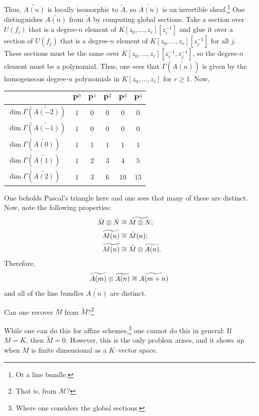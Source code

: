 \documentclass [11 pt, oneside] {article}
\begin{document}
Thus, $\widetilde{A(n)}$ is locally isomorphic to $\tilde A$, so $\widetilde{A(n)}$ is an invertible sheaf.\footnote{Or a line bundle.} One distinguishes $\widetilde{A(n)}$ from $\tilde A$ by computing global sections. Take a section over $U(f_i)$ that is a degree-$n$ element of $K[z_0,\hdots,z_r][z_i^{-1}]$ and glue it over a section of $U(f_j)$ that is a degree-$n$ element of $K[z_0,\hdots,z_r][z_j^{-1}]$ for all $j$. These sections must be the same over $K[z_0,\hdots,z_r][z_i^{-1},z_j^{-1}]$, so the degree-$n$ element must be a polynomial. Thus, one sees that $\Gamma(\widetilde{A(n)})$ is given by the homogeneous degree-$n$ polynomials in $K[z_0,\hdots,z_r]$ for $r\ge 1$. Now,
\begin{center}
\begin{tabular}{lccccc}
     & $\mathbf{P}^0$&$\mathbf{P}^1$&$\mathbf{P}^2$& $\mathbf{P}^3$&$\mathbf{P}^4$\\
    \midrule
	$\dim \Gamma (\widetilde{A(-2)})$ &$1$&$0$&$0$&$0$&$0$\\
	$\dim \Gamma (\widetilde{A(-1)})$&$1$&$0$&$0$&$0$&$0$\\
	$\dim \Gamma (\widetilde{A(0)})$&$1$&$1$&$1$&$1$&$1$\\
	$\dim \Gamma (\widetilde{A(1)})$&$1$&$2$&$3$&$4$&$5$\\
	$\dim \Gamma (\widetilde{A(2)})$&$1$&$3$&$6$&$10$&$15$
\end{tabular}
\end{center}
One beholds Pascal's triangle here and one sees that many of these are distinct. 
Now, note the following properties:
\begin{align*}
	\tilde M\otimes \tilde N &\cong \widetilde{M\otimes N};\\
	\widetilde{M(n)} &\cong \tilde M (n);\\
	\widetilde {M (n) } &\cong \tilde M \otimes \widetilde{A(n)}.
\end{align*}
Therefore,
\begin{align*}
	\widetilde{A (m)} \otimes \widetilde {A (n)} \cong \widetilde{A (m+n)}
\end{align*}
and all of the line bundles $\widetilde{A(n)}$ are distinct.

\begin{problem}
	Can one recover $M$ from $\tilde M$?\footnote{That is, from $\mathscr{M}$?}
\end{problem}

While one can do this for affine schemes,\footnote{Where one considers the global sections.} one cannot do this in general: If $M=K$, then $\tilde M = 0$. However, this is the only problem arises, and it shows up when $M$ is finite dimensional as a $K$--vector space.
\end{document}
